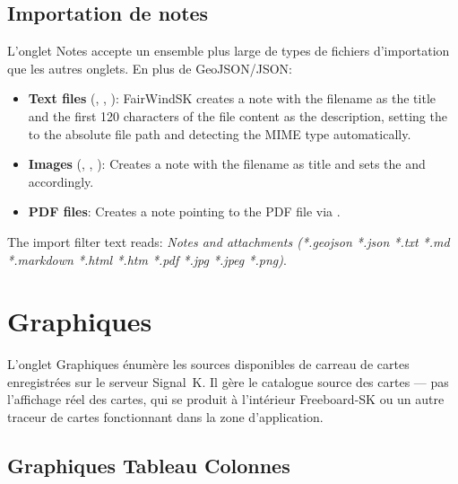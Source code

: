 \section{Importation de notes}

L'onglet Notes accepte un ensemble plus large de types de fichiers d'importation que les autres onglets.
En plus de GeoJSON/JSON:

\begin{itemize}
  \item \textbf{Text files} (, , ): FairWindSK creates a note with the filename as the title and the first 120 characters of the file content as the description, setting the  to the absolute file path and detecting the MIME type automatically.
  \item \textbf{Images} (, , ): Creates a note with the filename as title and sets the  and  accordingly.
  \item \textbf{PDF files}: Creates a note pointing to the PDF file via .
\end{itemize}

The import filter text reads: \textit{Notes and attachments (*.geojson *.json *.txt *.md *.markdown *.html *.htm *.pdf *.jpg *.jpeg *.png)}.

\chapter{Graphiques}
\label{ch:charts}

L'onglet Graphiques énumère les sources disponibles de carreau de cartes enregistrées sur le serveur Signal~K.
Il gère le catalogue source des cartes --- pas l'affichage réel des cartes, qui se produit à l'intérieur
Freeboard-SK ou un autre traceur de cartes fonctionnant dans la zone d'application.


\section{Graphiques Tableau Colonnes}

